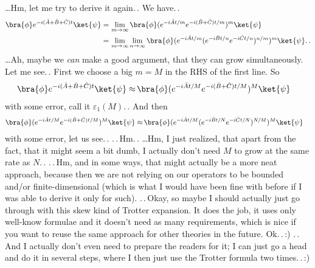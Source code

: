 \documentclass{report}
\begin{document}
\ldots Hm, let me try to derive it again.\,. 
We have.\,. 
\begin{align}
\begin{aligned}
	\bra{\phi} e^{-i (\hat A + \hat B + \hat C) t } \ket{\psi} =&\,
		\lim_{m \to \infty}
			\bra{\phi} (e^{-i \hat A t / m } e^{-i (\hat B + \hat C) t / m})^m \ket{\psi} \\
	=&\,
		\lim_{m \to \infty} \lim_{n \to \infty}
			\bra{\phi} (
				e^{-i \hat A t / m } 
				(e^{-i \hat B t / n} e^{-i \hat C t / n})^{n/m}
			)^m \ket{\psi}.\,.
\end{aligned}
\end{align} 
\ldots Ah, maybe we \emph{can} make a good argument, that they can grow simultaneously. Let me see.\,. First we choose a big $m=M$ in the RHS of the first line. So
\begin{align}
\begin{aligned}
	\bra{\phi} e^{-i (\hat A + \hat B + \hat C) t } \ket{\psi} 
	\approx&\,
	\bra{\phi} (e^{-i \hat A t / M } e^{-i (\hat B + \hat C) t / M})^M \ket{\psi} 
\end{aligned}
\end{align} 
with some error, call it $\varepsilon_1(M)$.\,. And then
\begin{align}
\begin{aligned}
	\bra{\phi} (e^{-i \hat A t / M } e^{-i (\hat B + \hat C) t / M})^M \ket{\psi} \approx&\,
		\bra{\phi} (
			e^{-i \hat A t / M } 
			(e^{-i \hat B t / N} e^{-i \hat C t / N})^{N/M}
		)^M \ket{\psi}
\end{aligned}
\end{align} 
with some error, let us see.\,. .\,.\,Hm.\,. \ldots Hm, I just realized, that apart from the fact, that it might seem a bit dumb, I actually don't need $M$ to grow at the same rate as $N$.\,. .\,.\,Hm, and in some ways, that might actually be a more neat approach, because then we are not relying on our operators to be bounded and/or finite-dimensional (which is what I would have been fine with before if I was able to derive it only for such). .\,.\,Okay, so maybe I should actually just go through with this skew kind of Trotter expansion. It does the job, it uses only well-know formulae and it doesn't need as many requirements, which is nice if you want to reuse the same approach for other theories in the future. Ok.\,.\,:) .\,.\,And I actually don't even need to prepare the readers for it; I can just go a head and do it in several steps, where I then just use the Trotter formula two times.\,.\,:) 
\end{document}
